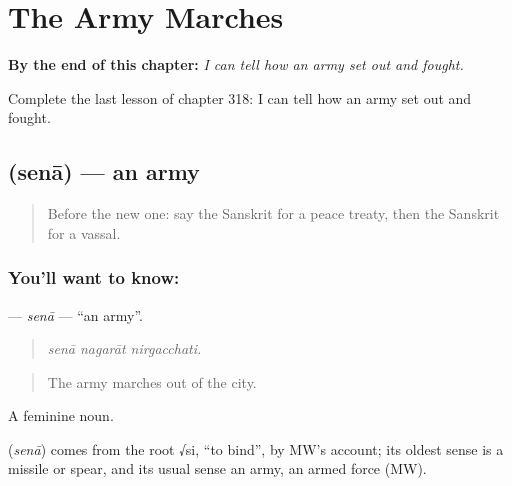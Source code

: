 
\chapter{The Army Marches}
\label{ch:sa-the-army-marches}

\begin{chapteropening}
\textbf{By the end of this chapter:} \emph{I can tell how an army set out and fought.}

Complete the last lesson of chapter 318: I can tell how an army set out and fought.
\end{chapteropening}

\section[\texorpdfstring{\sk{सेना} (senā)}{सेना (senā)}]{ (senā) — an army}

\label{lesson:SA-C318-sena}



\begin{quote}
Before the new one: say the Sanskrit for a peace treaty, then the Sanskrit for a vassal.
\end{quote}

\subsection*{You'll want to know: }
\textbf{} — \emph{senā} — \textquotedblleft{}an army\textquotedblright{}.

\begin{quote}
  
\end{quote}

\begin{quote}
\emph{senā nagarāt nirgacchati.}
\end{quote}

\begin{quote}
The army marches out of the city.
\end{quote}

A feminine noun.

\begin{cousinweb}
\textbf{} (\emph{senā}) comes from the root √si, \textquotedblleft{}to bind\textquotedblright{}, by MW's account; its oldest sense is a missile or spear, and its usual sense an army, an armed force (MW).
\end{cousinweb}

